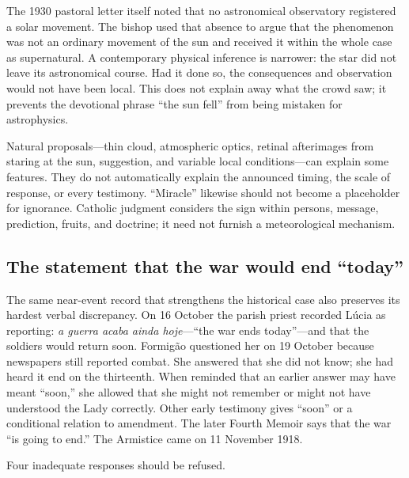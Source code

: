 The 1930 pastoral letter itself noted that no astronomical observatory registered a solar movement. The bishop used that absence to argue that the phenomenon was not an ordinary movement of the sun and received it within the whole case as supernatural. A contemporary physical inference is narrower: the star did not leave its astronomical course. Had it done so, the consequences and observation would not have been local. This does not explain away what the crowd saw; it prevents the devotional phrase “the sun fell” from being mistaken for astrophysics.

Natural proposals---thin cloud, atmospheric optics, retinal afterimages from staring at the sun, suggestion, and variable local conditions---can explain some features. They do not automatically explain the announced timing, the scale of response, or every testimony. “Miracle” likewise should not become a placeholder for ignorance. Catholic judgment considers the sign within persons, message, prediction, fruits, and doctrine; it need not furnish a meteorological mechanism.


\subsection{The statement that the war would end “today”}

The same near-event record that strengthens the historical case also preserves its hardest verbal discrepancy. On 16 October the parish priest recorded Lúcia as reporting: \emph{a guerra acaba ainda hoje}---“the war ends today”---and that the soldiers would return soon. Formigão questioned her on 19 October because newspapers still reported combat. She answered that she did not know; she had heard it end on the thirteenth. When reminded that an earlier answer may have meant “soon,” she allowed that she might not remember or might not have understood the Lady correctly. Other early testimony gives “soon” or a conditional relation to amendment. The later Fourth Memoir says that the war “is going to end.” The Armistice came on 11 November 1918.

Four inadequate responses should be refused.

